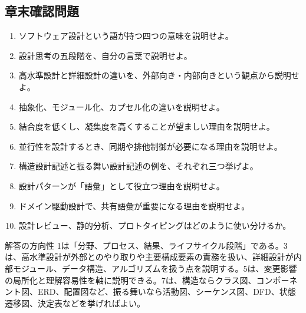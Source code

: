 \subsection{章末確認問題}

\begin{enumerate}
  \item ソフトウェア設計という語が持つ四つの意味を説明せよ。
  \item 設計思考の五段階を、自分の言葉で説明せよ。
  \item 高水準設計と詳細設計の違いを、外部向き・内部向きという観点から説明せよ。
  \item 抽象化、モジュール化、カプセル化の違いを説明せよ。
  \item 結合度を低くし、凝集度を高くすることが望ましい理由を説明せよ。
  \item 並行性を設計するとき、同期や排他制御が必要になる理由を説明せよ。
  \item 構造設計記述と振る舞い設計記述の例を、それぞれ三つ挙げよ。
  \item 設計パターンが「語彙」として役立つ理由を説明せよ。
  \item ドメイン駆動設計で、共有語彙が重要になる理由を説明せよ。
  \item 設計レビュー、静的分析、プロトタイピングはどのように使い分けるか。
\end{enumerate}

\begin{pointbox}{解答の方向性}
1は「分野、プロセス、結果、ライフサイクル段階」である。3は、高水準設計が外部とのやり取りや主要構成要素の責務を扱い、詳細設計が内部モジュール、データ構造、アルゴリズムを扱う点を説明する。5は、変更影響の局所化と理解容易性を軸に説明できる。7は、構造ならクラス図、コンポーネント図、ERD、配置図など、振る舞いなら活動図、シーケンス図、DFD、状態遷移図、決定表などを挙げればよい。
\end{pointbox}
